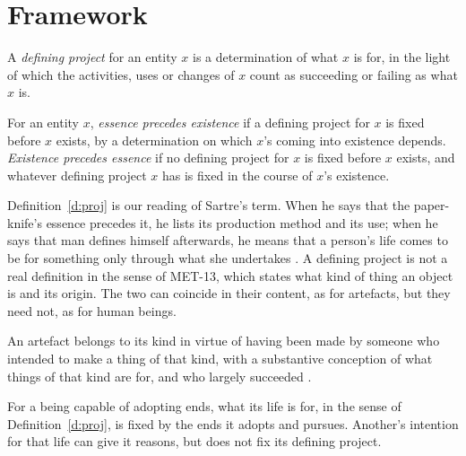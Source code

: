 \documentclass{situationist-preprint}
\begin{document}
\section{Framework}

\begin{definition}\label{d:proj}
A \emph{defining project} for an entity $x$ is a determination of what $x$ is for, in the light of which the activities, uses or changes of $x$ count as succeeding or failing as what $x$ is.
\end{definition}

\begin{definition}[Precedence]\label{d:prec}
For an entity $x$, \emph{essence precedes existence} if a defining project for $x$ is fixed before $x$ exists, by a determination on which $x$'s coming into existence depends. \emph{Existence precedes essence} if no defining project for $x$ is fixed before $x$ exists, and whatever defining project $x$ has is fixed in the course of $x$'s existence.
\end{definition}

Definition~\ref{d:proj} is our reading of Sartre's term. When he says that the paper-knife's essence precedes it, he lists its production method and its use; when he says that man defines himself afterwards, he means that a person's life comes to be for something only through what she undertakes \citep{Sartre1946}. A defining project is not a real definition in the sense of MET-13, which states what kind of thing an object is and its origin. The two can coincide in their content, as for artefacts, but they need not, as for human beings.

\begin{principle}\label{p:art}
An artefact belongs to its kind in virtue of having been made by someone who intended to make a thing of that kind, with a substantive conception of what things of that kind are for, and who largely succeeded \citep{Hilpinen1992,Thomasson2003}.
\end{principle}

\begin{principle}\label{p:agent}
For a being capable of adopting ends, what its life is for, in the sense of Definition~\ref{d:proj}, is fixed by the ends it adopts and pursues. Another's intention for that life can give it reasons, but does not fix its defining project.
\end{principle}
\end{document}
